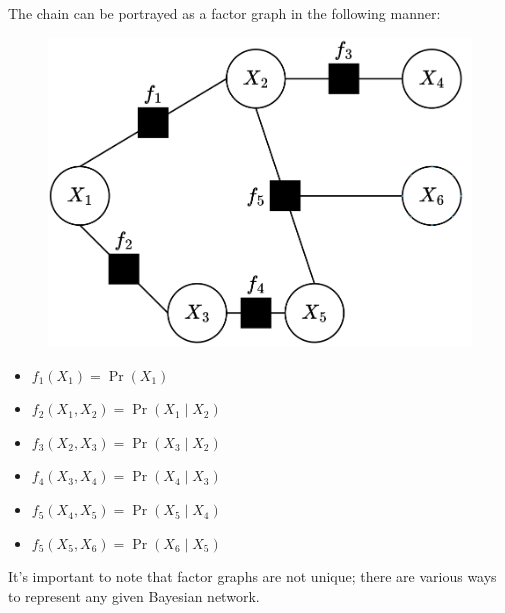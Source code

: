 \begin{example}
    The chain can be portrayed as a factor graph in the following manner:
    \begin{figure}[H]
        \centering
        \includegraphics[width=0.3\linewidth]{images/bnf.png}
    \end{figure}
    \begin{itemize}
        \item $f_1(X_1)=\Pr(X_1)$
        \item $f_2(X_1,X_2)=\Pr(X_1\mid X_2)$
        \item $f_3(X_2,X_3)=\Pr(X_3\mid X_2)$
        \item $f_4(X_3,X_4)=\Pr(X_4\mid X_3)$
        \item $f_5(X_4,X_5)=\Pr(X_5\mid X_4)$
        \item $f_5(X_5,X_6)=\Pr(X_6\mid X_5)$
    \end{itemize}
\end{example}
It's important to note that factor graphs are not unique; there are various ways to represent any given Bayesian network.

